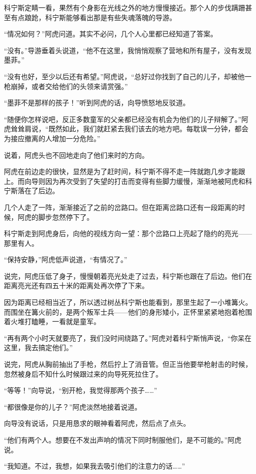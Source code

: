 科宁斯定睛一看，果然有个身影在光线之外的地方慢慢接近。那个人的步伐蹒跚甚至有点踉跄，科宁斯能够看出那是有些失魂落魄的导游。

“情况如何？”阿虎问道。其实不必问，几个人心里都已经知道了答案。

“没有。”导游垂着头说道，“他不在这里，我悄悄观察了营地和所有屋子，没有发现墨菲。”

“没有也好，至少以后还有希望。”阿虎说，“总好过你找到了自己的儿子，却被他一枪崩掉，或者交给他们的头领来请赏强。”

“墨菲不是那样的孩子！”听到阿虎的话，向导愤怒地反驳道。

“随便你怎样说吧，反正多数童军的父亲都已经没有机会为他们的儿子辩解了。”阿虎耸耸肩说，“既然如此，我们就赶紧去我们该去的地方吧。每耽误一分钟，都会为接应撤离的人增加一分危险。”

说着，阿虎头也不回地走向了他们来时的方向。

阿虎在前边走的很快，显然是为了赶时间，科宁斯不得不走一阵就跑几步才能跟上。而向导则因为再次受到了失望的打击而变得有些脚力缓慢，渐渐地被阿虎和科宁斯落在了后边。

几个人走了一阵，渐渐接近了之前的岔路口。但在距离岔路口还有一段距离的时候，阿虎的脚步忽然停下了。

科宁斯走到阿虎身后，向他的视线方向一望：那个岔路口上亮起了隐约的亮光——那里有人。

“保持安静，”阿虎低声说道，“有情况了。”

说完，阿虎压低了身子，慢慢朝着亮光处走了过去，科宁斯也跟在了后边。他们在距离亮光还有四五十米的距离处再次停了下来。

因为距离已经相当近了，所以透过树丛科宁斯也能看到，那里生起了一小堆篝火。而围坐在篝火前的，是两个叛军士兵——他们的身形矮小，正怀里紧紧地抱着枪围着火堆打瞌睡，一看就是童军。

“再有两个小时天就要亮了，我们没时间绕路了。”阿虎对着科宁斯悄声说，“你呆在这里，我去搞定他们。”

说完，阿虎从胸前抽出了手枪，然后拧上了消音管。但正当他要举枪射击的时候，忽然被身后不知什么时候跟过来的向导死死拉住了。

“等等！”向导说，“别开枪，我觉得那两个孩子……”

“都很像是你的儿子？”阿虎淡然地接着说道。

向导没有说话，只是用恳求的眼神看着阿虎，然后点了点头。

“他们有两个人。想要在不发出声响的情况下同时制服他们，是不可能的。”阿虎说。

“我知道。不过，我想，如果我去吸引他们的注意力的话……”

